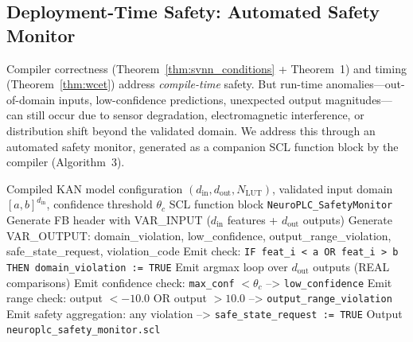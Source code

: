 \documentclass[journal,onecolumn]{IEEEtran}
\begin{document}
\subsection{Deployment-Time Safety: Automated Safety Monitor}
\label{sec:safety-monitor}

Compiler correctness (Theorem~\ref{thm:svnn_conditions} + Theorem~1) and
timing (Theorem~\ref{thm:wcet}) address \textit{compile-time} safety.
But run-time anomalies---out-of-domain inputs, low-confidence predictions,
unexpected output magnitudes---can still occur due to sensor degradation,
electromagnetic interference, or distribution shift beyond the validated
domain. We address this through an automated safety monitor, generated as
a companion SCL function block by the compiler (Algorithm~3).

\vspace{4pt}
\begin{algorithm}[t]
\caption{Safety Monitor Generation (Algorithm~3)}
\label{alg:safety_monitor}
\begin{algorithmic}[1]
\Require Compiled KAN model configuration $(d_{\text{in}}, d_{\text{out}},
N_{\text{LUT}})$, validated input domain $[a,b]^{d_{\text{in}}}$,
confidence threshold $\theta_c$
\Ensure SCL function block \texttt{NeuroPLC\_SafetyMonitor}
\State Generate FB header with VAR\_INPUT ($d_{\text{in}}$ features +
      $d_{\text{out}}$ outputs)
\State Generate VAR\_OUTPUT: domain\_violation, low\_confidence,
     output\_range\_violation, safe\_state\_request, violation\_code
    \State Emit check: \texttt{IF feat\_i < a OR feat\_i > b THEN
         domain\_violation := TRUE}
\EndFor
\State Emit argmax loop over $d_{\text{out}}$ outputs (REAL comparisons)
\State Emit confidence check: \texttt{max\_conf} $< \theta_c$ --> \texttt{low\_confidence}
    \State Emit range check: output $< -10.0$ OR output $> 10.0$ --> \texttt{output\_range\_violation}
\EndFor
\State Emit safety aggregation: any violation --> \texttt{safe\_state\_request := TRUE}
\State Output \texttt{neuroplc\_safety\_monitor.scl}
\end{algorithmic}
\end{algorithm}
\end{document}
